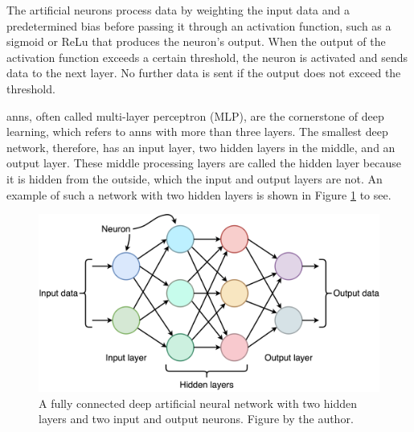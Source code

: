     The artificial neurons process data by weighting the input data and a predetermined bias before passing it through an activation function, such as a sigmoid or ReLu \cite{dubeyActivationFunctionsDeep2022} that produces the neuron's output. When the output of the activation function exceeds a certain threshold, the neuron is activated and sends data to the next layer. No further data is sent if the output does not exceed the threshold.

    
   \glspl{ann}, often called multi-layer perceptron (MLP), are the cornerstone of deep learning, which refers to \glspl{ann} with more than three layers. The smallest deep network, therefore, has an input layer, two hidden layers in the middle, and an output layer. These middle processing layers are called the hidden layer because it is hidden from the outside, which the input and output layers are not. An example of such a network with two hidden layers is shown in Figure \ref{fig:deep_network} to see. 


    \begin{figure}[htb]
        \centering
        \includegraphics[width=\linewidth]{images/deep_neural_network.png}
        \caption{A fully connected deep artificial neural network with two hidden layers and two input and output neurons. Figure by the author.}
        \label{fig:deep_network}
    \end{figure}


